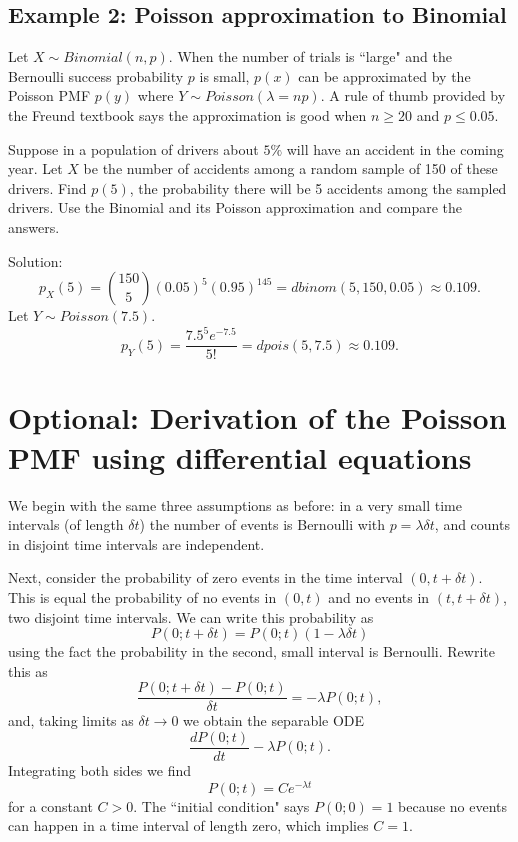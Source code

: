 \documentclass[]{book}
\begin{document}
\subsection{Example 2: Poisson approximation to
Binomial}\label{example-2-poisson-approximation-to-binomial}

Let \(X\sim Binomial(n,p)\). When the number of trials is ``large" and
the Bernoulli success probability \(p\) is small, \(p(x)\) can be
approximated by the Poisson PMF \(p(y)\) where
\(Y\sim Poisson(\lambda = np)\). A rule of thumb provided by the Freund
textbook says the approximation is good when \(n\geq 20\) and
\(p\leq 0.05\).

Suppose in a population of drivers about \(5\%\) will have an accident
in the coming year. Let \(X\) be the number of accidents among a random
sample of 150 of these drivers. Find \(p(5)\), the probability there
will be 5 accidents among the sampled drivers. Use the Binomial and its
Poisson approximation and compare the answers.

Solution:
\[p_X(5) = {150 \choose 5}(0.05)^5(0.95)^{145} = dbinom(5,150,0.05) \approx 0.109. \]
Let \(Y \sim Poisson(7.5)\).
\[p_Y(5) = \frac{7.5^5 e^{-7.5}}{5!} = dpois(5,7.5) \approx 0.109. \]

\section{Optional: Derivation of the Poisson PMF using differential
equations}\label{optional-derivation-of-the-poisson-pmf-using-differential-equations}

We begin with the same three assumptions as before: in a very small time
intervals (of length \(\delta t\)) the number of events is Bernoulli
with \(p=\lambda\delta t\), and counts in disjoint time intervals are
independent.

Next, consider the probability of zero events in the time interval
\((0, t+\delta t)\). This is equal the probability of no events in
\((0,t)\) and no events in \((t, t+\delta t)\), two disjoint time
intervals. We can write this probability as
\[P(0; t+\delta t) = P(0;t)(1-\lambda \delta t)\] using the fact the
probability in the second, small interval is Bernoulli. Rewrite this as
\[\frac{P(0;t+\delta t)-P(0;t)}{\delta t} = -\lambda P(0;t),\] and,
taking limits as \(\delta t \rightarrow 0\) we obtain the separable ODE
\[\frac{dP(0;t)}{dt} - \lambda P(0;t).\] Integrating both sides we find
\[P(0;t) = Ce^{-\lambda t}\] for a constant \(C>0\). The ``initial
condition" says \(P(0;0) = 1\) because no events can happen in a time
interval of length zero, which implies \(C=1\).
\end{document}
